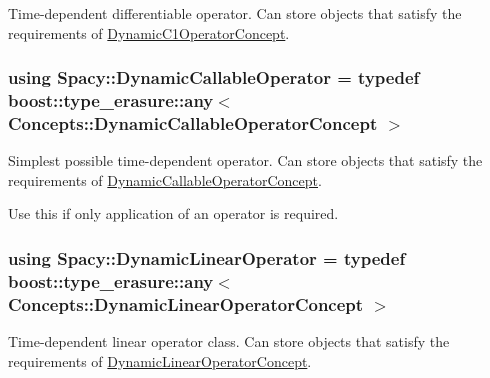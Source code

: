 Time-\/dependent differentiable operator. Can store objects that satisfy the requirements of \hyperlink{group__ConceptGroup_gaa7ef0ce2d66b0610035541b580564b11_DynamicC1OperatorConceptAnchor}{Dynamic\+C1\+Operator\+Concept}. 

\label{group__SpacyGroup_gabc9c830d2a7e020bcab097b10ee6f642_DynamicC1OperatorAnchor}%
\hypertarget{group__SpacyGroup_gabc9c830d2a7e020bcab097b10ee6f642_DynamicC1OperatorAnchor}{}%
\hypertarget{group__SpacyGroup_ga750d55072f7a3a16a1263961147333c0_ga750d55072f7a3a16a1263961147333c0}{}
\subsubsection[{Dynamic\+Callable\+Operator}]{\setlength{\rightskip}{0pt plus 5cm}using {\bf Spacy\+::\+Dynamic\+Callable\+Operator} = typedef boost\+::type\+\_\+erasure\+::any$<$ Concepts\+::\+Dynamic\+Callable\+Operator\+Concept $>$}\label{group__SpacyGroup_ga750d55072f7a3a16a1263961147333c0_ga750d55072f7a3a16a1263961147333c0}


Simplest possible time-\/dependent operator. Can store objects that satisfy the requirements of \hyperlink{group__ConceptGroup_ga30692db093ead5a1a074905363a2f043_DynamicCallableOperatorConceptAnchor}{Dynamic\+Callable\+Operator\+Concept}. 

\label{group__SpacyGroup_ga750d55072f7a3a16a1263961147333c0_DynamicCallableOperatorAnchor}%
\hypertarget{group__SpacyGroup_ga750d55072f7a3a16a1263961147333c0_DynamicCallableOperatorAnchor}{}%
Use this if only application of an operator is required. \hypertarget{group__SpacyGroup_gaad10aa7d5443703377b768fa41a3c7ea_gaad10aa7d5443703377b768fa41a3c7ea}{}
\subsubsection[{Dynamic\+Linear\+Operator}]{\setlength{\rightskip}{0pt plus 5cm}using {\bf Spacy\+::\+Dynamic\+Linear\+Operator} = typedef boost\+::type\+\_\+erasure\+::any$<$ Concepts\+::\+Dynamic\+Linear\+Operator\+Concept $>$}\label{group__SpacyGroup_gaad10aa7d5443703377b768fa41a3c7ea_gaad10aa7d5443703377b768fa41a3c7ea}


Time-\/dependent linear operator class. Can store objects that satisfy the requirements of \hyperlink{group__ConceptGroup_ga015b0d099011a2ef73a16aa9b36a7346_DynamicLinearOperatorConceptAnchor}{Dynamic\+Linear\+Operator\+Concept}. 


